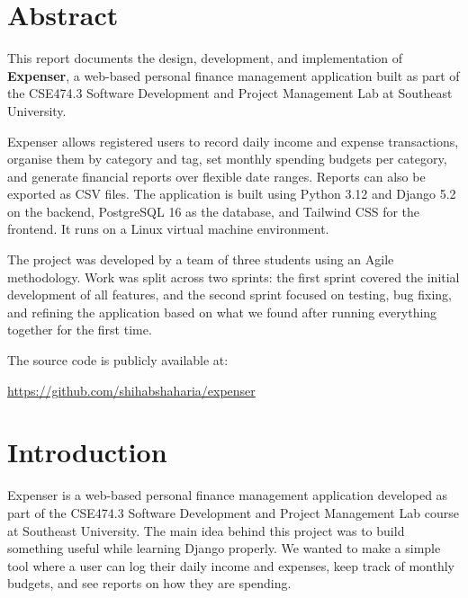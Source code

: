 \documentclass[12pt,a4paper]{report}
\begin{document}
\tableofcontents
\newpage

\chapter*{Abstract}

This report documents the design, development, and implementation of \textbf{Expenser}, a web-based personal finance management application built as part of the CSE474.3 Software Development and Project Management Lab at Southeast University.

Expenser allows registered users to record daily income and expense transactions, organise them by category and tag, set monthly spending budgets per category, and generate financial reports over flexible date ranges. Reports can also be exported as CSV files. The application is built using Python 3.12 and Django 5.2 on the backend, PostgreSQL 16 as the database, and Tailwind CSS for the frontend. It runs on a Linux virtual machine environment.

The project was developed by a team of three students using an Agile methodology. Work was split across two sprints: the first sprint covered the initial development of all features, and the second sprint focused on testing, bug fixing, and refining the application based on what we found after running everything together for the first time.

The source code is publicly available at:
\begin{center}
\url{https://github.com/shihabshaharia/expenser}
\end{center}

\newpage

\chapter{Introduction}

Expenser is a web-based personal finance management application developed as part of the CSE474.3 Software Development and Project Management Lab course at Southeast University. The main idea behind this project was to build something useful while learning Django properly. We wanted to make a simple tool where a user can log their daily income and expenses, keep track of monthly budgets, and see reports on how they are spending.
\end{document}
